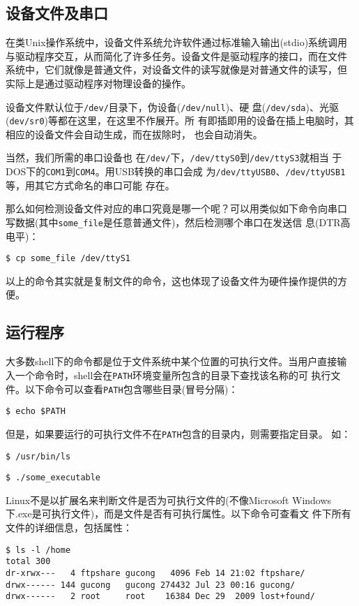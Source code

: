 \documentclass[a4paper]{article}
\begin{document}
\subsection{设备文件及串口}
\label{dev}

在类Unix操作系统中，设备文件系统允许软件通过标准输入输出(stdio)系统调用
与驱动程序交互，从而简化了许多任务。设备文件是驱动程序的接口，而在文件
系统中，它们就像是普通文件，对设备文件的读写就像是对普通文件的读写，但
实际上是通过驱动程序对物理设备的操作。

设备文件默认位于\verb|/dev/|目录下，伪设备(\verb|/dev/null|)、硬
盘(\verb|/dev/sda|)、光驱(\verb|dev/sr0|)等都在这里，在这里不作展开。所
有即插即用的设备在插上电脑时，其相应的设备文件会自动生成，而在拔除时，
也会自动消失。

当然，我们所需的串口设备也
在\verb|/dev/|下，\verb|/dev/ttyS0|到\verb|/dev/ttyS3|就相当
于DOS下的\verb|COM1|到\verb|COM4|。用USB转换的串口会成
为\verb|/dev/ttyUSB0|、\verb|/dev/ttyUSB1|等，用其它方式命名的串口可能
存在。

那么如何检测设备文件对应的串口究竟是哪一个呢？可以用类似如下命令向串口
写数据(其中\verb|some_file|是任意普通文件)，然后检测哪个串口在发送信
息(DTR高电平)：
\begin{verbatim}
$ cp some_file /dev/ttyS1
\end{verbatim}

以上的命令其实就是复制文件的命令，这也体现了设备文件为硬件操作提供的方
便。

\subsection{运行程序}
大多数shell下的命令都是位于文件系统中某个位置的可执行文件。当用户直接输
入一个命令时，shell会在\verb|PATH|环境变量所包含的目录下查找该名称的可
执行文件。以下命令可以查看\verb|PATH|包含哪些目录(冒号分隔)：
\begin{verbatim}
$ echo $PATH
\end{verbatim}

但是，如果要运行的可执行文件不在\verb|PATH|包含的目录内，则需要指定目录。
如：
\begin{verbatim}
$ /usr/bin/ls
\end{verbatim}
\begin{verbatim}
$ ./some_executable
\end{verbatim}

Linux不是以扩展名来判断文件是否为可执行文件的(不像Microsoft
Windows下.exe是可执行文件)，而是文件是否有可执行属性。以下命令可查看文
件下所有文件的详细信息，包括属性：
\begin{verbatim}
$ ls -l /home
total 300
dr-xrwx---   4 ftpshare gucong   4096 Feb 14 21:02 ftpshare/
drwx------ 144 gucong   gucong 274432 Jul 23 00:16 gucong/
drwx------   2 root     root    16384 Dec 29  2009 lost+found/
\end{verbatim}
\end{document}
